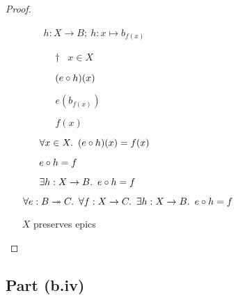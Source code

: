 \begin{prop}
\begin{proof}
\begin{itemize}
\begin{itemize}
            \addtolength{\itemsep}{+1\baselineskip}
            \item[\phs]
              \Let~$h : X \to B;~h : x \mapsto b_{f(x)}$
            \addtolength{\itemsep}{-1\baselineskip}

          \item[\phs]
              \begin{itemize}
                \item[$\dagger$]
                  \Let~$x\in X$
                  \marginnote{\Hyp}

                \item[\phs] $(e\circ h)(x)$

                \item[\eqs] $e(b_{f(x)})$

                \item[\eqs] $f(x)$
              \end{itemize}

              \item[\imps]
                $\forall x\in X\ldotp~(e\circ h)(x) = f(x)$
                \marginnote{$\forall$-\Intro-$\dagger$}

              \item[\iffs]
                $e\circ h = f$
                \marginnote{\Def-$=$}

              \item[\imps]
                $\exists h : X \to B\ldotp~e\circ h = f$
                \marginnote{$\exists$-\Intro}
        \end{itemize}

        \item[\imps]
          $\forall e : B\twoheadrightarrow C\ldotp~\forall f : X \to C\ldotp~\exists h : X \to B\ldotp~e\circ h = f$
          \marginnote{$\forall$-\Intro-$\star$}

        \item[\iffs]
          $X$ preserves epics
          \qedhere
          \marginnote{\Thm-\ref{prop:epic-preserving}}
    \end{itemize}
  \end{proof}
\end{prop}

\subsection{Part (b.iv)}\label{sec:q-1-b-iv}

